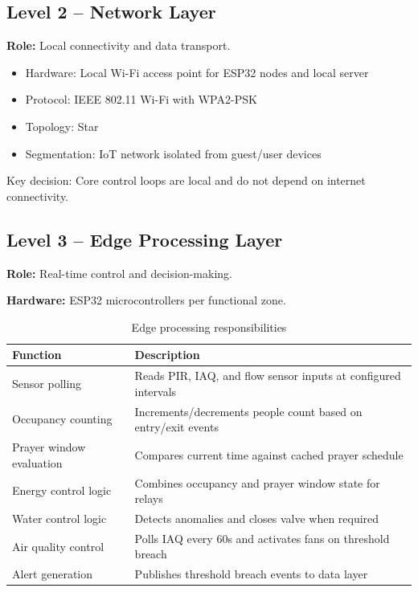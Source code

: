 \subsection{Level 2 -- Network Layer}
\textbf{Role:} Local connectivity and data transport.
\begin{itemize}
  \item Hardware: Local Wi-Fi access point for ESP32 nodes and local server
  \item Protocol: IEEE 802.11 Wi-Fi with WPA2-PSK
  \item Topology: Star
  \item Segmentation: IoT network isolated from guest/user devices
\end{itemize}

Key decision: Core control loops are local and do not depend on internet connectivity.

\subsection{Level 3 -- Edge Processing Layer}
\textbf{Role:} Real-time control and decision-making.

\textbf{Hardware:} ESP32 microcontrollers per functional zone.

\begin{table}[htbp]
\centering
\begin{tabular*}{\textwidth}{@{\extracolsep{\fill}}L{4.6cm} L{11.5cm}}
\toprule
\textbf{Function} & \textbf{Description} \\
\midrule
Sensor polling & Reads PIR, IAQ, and flow sensor inputs at configured intervals \\
Occupancy counting & Increments/decrements people count based on entry/exit events \\
Prayer window evaluation & Compares current time against cached prayer schedule \\
Energy control logic & Combines occupancy and prayer window state for relays \\
Water control logic & Detects anomalies and closes valve when required \\
Air quality control & Polls IAQ every 60s and activates fans on threshold breach \\
Alert generation & Publishes threshold breach events to data layer \\
\bottomrule
\end{tabular*}
\caption{Edge processing responsibilities}
\end{table}


